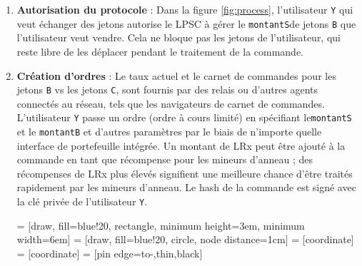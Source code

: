 \documentclass[UTF8,nofonts]{article}
\makeatletter
\newenvironment{figurehere}
 {\def\@captype{figure}}
 {}
\makeatother
\begin{document}
\begin{multicols}{2}
\begin{enumerate} 


\item \textbf{Autorisation du protocole} : Dans la figure \ref{fig:process}, l'utilisateur \verb|Y| qui veut échanger des jetons autorise le LPSC à gérer le \verb|montantS|de jetons \verb|B| que l'utilisateur veut vendre. Cela ne bloque pas les jetons de l'utilisateur, qui reste libre de les déplacer pendant le traitement de la commande.

\item \textbf{Création d’ordres} : Le taux actuel et le carnet de commandes pour les jetons \verb|B| vs les jetons \verb|C|, sont fournis par des relais ou d'autres agents connectés au réseau, tels que les navigateurs de carnet de commandes. L'utilisateur \verb|Y| passe un ordre (ordre à cours limité) en spécifiant le\verb|montantS| et le \verb|montantB| et d'autres paramètres par le biais de n'importe quelle interface de portefeuille intégrée. Un montant de LRx peut être ajouté à la commande en tant que récompense pour les mineurs d'anneau ; des récompenses de LRx plus élevés signifient une meilleure chance d'être traités rapidement par les mineurs d'anneau. Le hash de la commande est signé avec la clé privée de l'utilisateur \verb|Y|.



\begin{center}
\begin{figurehere}
\centering
{} = [draw, fill=blue!20, rectangle, 
    minimum height=3em, minimum width=6em]
 = [draw, fill=blue!20, circle, node distance=1cm]
 = [coordinate]
 = [coordinate]
 = [pin edge={to-,thin,black}]

\begin{tikzpicture}[
    auto, 
    scale=0.7,
    node distance=2cm,
    >=latex',
    font=\bfseries\footnotesize\sffamily,
    order/.style={
		rectangle,
		scale=0.7,
		rounded corners,
		draw=black, 
		text centered,
		minimum height=12mm,
		minimum width=30mm,
		fill=white
	},
	role/.style={
		circle,
		scale=0.7,
		draw=black, 
		text centered,
		minimum height=12mm,
		minimum width=12mm,
		fill=white
	},
	steps/.style={
		circle,
		scale=0.7,
		draw=black, 
		text centered,
		fill=black,
		text=white
	},
	account/.style={
		circle,
		scale=0.7,
		draw=black, 
		text centered,
		minimum height=16mm,
		minimum width=16mm,
		fill=white
	},
	label/.style={
	  scale=0.7
    }
  ]


\end{tikzpicture}
\end{figurehere}
\end{center}
\end{enumerate}
\end{multicols}
\end{document}
